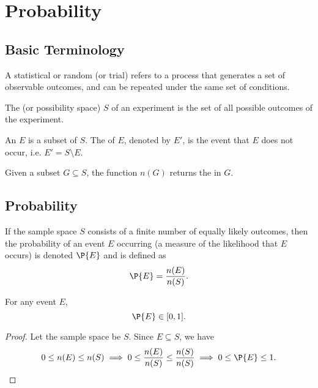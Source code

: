 \chapter{Probability}\label{chap:Probability}

\section{Basic Terminology}

\begin{definition}
    A statistical or random  (or trial) refers to a process that generates a set of observable outcomes, and can be repeated under the same set of conditions.
\end{definition}

\begin{definition}
    The  (or possibility space) $S$ of an experiment is the set of all possible outcomes of the experiment.
\end{definition}

\begin{definition}
    An  $E$ is a subset of $S$. The  of $E$, denoted by $E'$, is the event that $E$ does not occur, i.e. $E' = S \setminus E$.
\end{definition}

\begin{definition}
    Given a subset $G \subseteq S$, the function $n(G)$ returns the  in $G$.
\end{definition}

\section{Probability}

\begin{definition}
    If the sample space $S$ consists of a finite number of equally likely outcomes, then the probability of an event $E$ occurring (a measure of the likelihood that $E$ occurs) is denoted $\P{E}$ and is defined as \[\P{E} = \frac{n(E)}{n(S)}.\]
\end{definition}

\begin{proposition}
    For any event $E$, \[\P{E} \in [0, 1].\]
\end{proposition}
\begin{proof}
    Let the sample space be $S$. Since $E \subseteq S$, we have \[0 \leq n(E) \leq n(S) \implies 0 \leq \frac{n(E)}{n(S)} \leq \frac{n(S)}{n(S)} \implies 0 \leq \P{E} \leq 1.\]
\end{proof}

